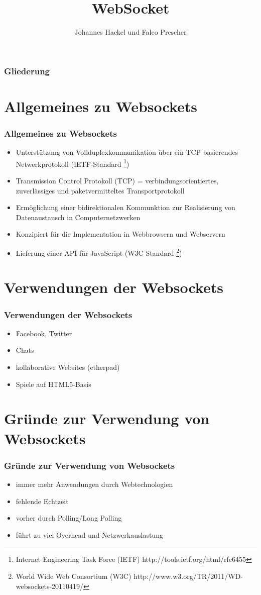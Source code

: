 \documentclass{beamer}
\author{Johannes Hackel und Falco Prescher}
\title{WebSocket}
\begin{document}
\begin{frame}
\titlepage
\end{frame}

\begin{frame}
\frametitle{Gliederung}
\tableofcontents
\end{frame}

\section{Allgemeines zu Websockets}
\begin{frame}
\frametitle{Allgemeines zu Websockets}
\begin{itemize}
\item Unterstützung von Vollduplexkommunikation über ein TCP basierendes Netwerkprotokoll (IETF-Standard \footnote{\tiny{Internet Engineering Task Force (IETF) http://tools.ietf.org/html/rfc6455}})
\item Transmission Control Protokoll (TCP) = verbindungsorientiertes, zuverlässiges und paketvermitteltes Transportprotokoll
\item Ermöglichung einer bidirektionalen Kommunktion zur Realisierung von Datenaustausch in Computernetzwerken
\item Konzipiert für die Implementation in Webbrowsern und Webservern
\item Lieferung einer API für JavaScript (W3C Standard \footnote{\tiny{World Wide Web Consortium (W3C) http://www.w3.org/TR/2011/WD-websockets-20110419/}})
\end{itemize}
\end{frame}

\section{Verwendungen der Websockets}
\begin{frame}
\frametitle{Verwendungen der Websockets}
\begin{itemize}
\item Facebook, Twitter
\item Chats
\item kollaborative Websites (etherpad)
\item Spiele auf HTML5-Basis
\end{itemize}
\end{frame}

\section{Gründe zur Verwendung von Websockets}
\begin{frame}
\frametitle{Gründe zur Verwendung von Websockets}
\begin{itemize}
\item immer mehr Anwendungen durch Webtechnologien
\item fehlende Echtzeit
\item vorher durch Polling/Long Polling
\item führt zu viel Overhead und Netzwerkauslastung
\end{itemize}
\end{frame}
\end{document}
